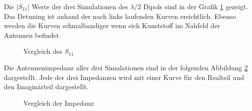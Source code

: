 Die $|S_{11}|$ Werte der drei Simulationen des $\lambda/2$ Dipols sind in der Grafik \ref{S11_Vergleich_Simulation} gezeigt. Das Detuning ist anhand der nach links laufenden Kurven ersichtlich. Ebenso werden die Kurven schmalbandiger wenn sich Kunststoff im Nahfeld der Antennen befindet.

\begin{figure}[!ht]
	\centering
	\begingroup
	
	\endgroup
	\caption{Vergleich des $S_{11}$}
	\label{S11_Vergleich_Simulation}
\end{figure}
\newpage
Die Antennenimpedanz aller drei Simulationen sind in der folgenden Abbildung \ref{Impedanz_Vergleich_Simulation} dargestellt. Jede der drei Impedanzen wird mit einer Kurve für den Realteil und den Imaginärteil dargestellt. 
\begin{figure}[!ht]
	\centering
	\begingroup
	
	\endgroup
	\caption{Vergleich der Impedanz}
	\label{Impedanz_Vergleich_Simulation}
\end{figure}
\clearpage
\newpage

